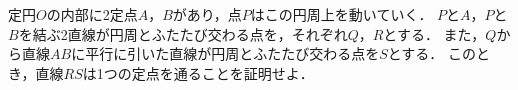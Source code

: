 \documentclass[../../main.tex]{subfiles}
\begin{document}
定円$O$の内部に2定点$A$，$B$があり，点$P$はこの円周上を動いていく．
$P$と$A$，$P$と$B$を結ぶ2直線が円周とふたたび交わる点を，それぞれ$Q$，$R$とする．
また，$Q$から直線$AB$に平行に引いた直線が円周とふたたび交わる点を$S$とする．
このとき，直線$RS$は1つの定点を通ることを証明せよ．
\end{document}
